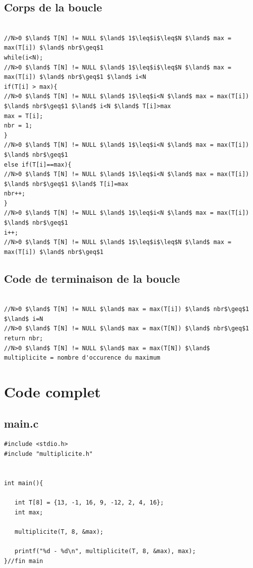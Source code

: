 \documentclass[a4paper, 11pt, oneside]{article}
\begin{document}
\subsection{Corps de la boucle}

\begin{lstlisting}[caption={Corps de la boucle}]

//N>0 $\land$ T[N] != NULL $\land$ 1$\leq$i$\leq$N $\land$ max = max(T[i]) $\land$ nbr$\geq$1
while(i<N);
//N>0 $\land$ T[N] != NULL $\land$ 1$\leq$i$\leq$N $\land$ max = max(T[i]) $\land$ nbr$\geq$1 $\land$ i<N
if(T[i] > max){
//N>0 $\land$ T[N] != NULL $\land$ 1$\leq$i<N $\land$ max = max(T[i]) $\land$ nbr$\geq$1 $\land$ i<N $\land$ T[i]>max
max = T[i];
nbr = 1;
}
//N>0 $\land$ T[N] != NULL $\land$ 1$\leq$i<N $\land$ max = max(T[i]) $\land$ nbr$\geq$1
else if(T[i]==max){
//N>0 $\land$ T[N] != NULL $\land$ 1$\leq$i<N $\land$ max = max(T[i]) $\land$ nbr$\geq$1 $\land$ T[i]=max
nbr++;
}
//N>0 $\land$ T[N] != NULL $\land$ 1$\leq$i<N $\land$ max = max(T[i]) $\land$ nbr$\geq$1
i++;
//N>0 $\land$ T[N] != NULL $\land$ 1$\leq$i$\leq$N $\land$ max = max(T[i]) $\land$ nbr$\geq$1

\end{lstlisting}


\subsection{Code de terminaison de la boucle}

\begin{lstlisting}[caption={Code de terminaison de la boucle}]

//N>0 $\land$ T[N] != NULL $\land$ max = max(T[i]) $\land$ nbr$\geq$1 $\land$ i=N
//N>0 $\land$ T[N] != NULL $\land$ max = max(T[N]) $\land$ nbr$\geq$1
return nbr;
//N>0 $\land$ T[N] != NULL $\land$ max = max(T[N]) $\land$ multiplicite = nombre d'occurence du maximum

\end{lstlisting}


\section{Code complet}


\subsection{main.c}

\begin{lstlisting}[caption={Main.c}]
#include <stdio.h>
#include "multiplicite.h"


int main(){

   int T[8] = {13, -1, 16, 9, -12, 2, 4, 16};
   int max;

   multiplicite(T, 8, &max);

   printf("%d - %d\n", multiplicite(T, 8, &max), max);
}//fin main
\end{lstlisting}
\end{document}
